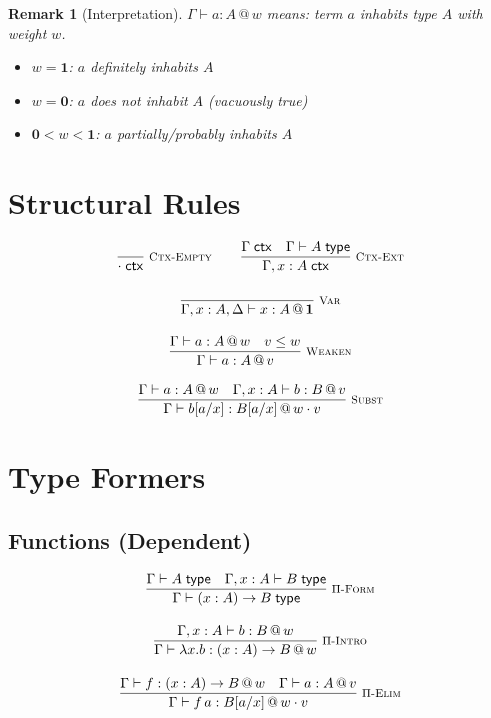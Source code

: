 \documentclass[11pt,a4paper]{article}
\makeatletter
\newcommand{\infer}[3][]{%
  \genfrac{}{}{0.4pt}{0}{#3}{#2}\;\textsc{\footnotesize #1}%
}
\newtheorem{remark}{Remark}[section]
\newcommand{\ctx}{\;\mathsf{ctx}}
\newcommand{\type}{\;\mathsf{type}}
\newcommand{\at}[1]{\,@\,#1}
\newcommand{\one}{\mathbf{1}}
\newcommand{\zero}{\mathbf{0}}
\makeatother
\begin{document}
\begin{remark}[Interpretation]
$\Gamma \vdash a : A \at{w}$ means: term $a$ inhabits type $A$ with weight $w$.
\begin{itemize}
    \item $w = \one$: $a$ definitely inhabits $A$
    \item $w = \zero$: $a$ does not inhabit $A$ (vacuously true)
    \item $\zero < w < \one$: $a$ partially/probably inhabits $A$
\end{itemize}
\end{remark}

\section{Structural Rules}

\begin{gather}
\infer[\textsc{Ctx-Empty}]
  {\cdot \ctx}
  {}
\qquad
\infer[\textsc{Ctx-Ext}]
  {\Gamma, x : A \ctx}
  {\Gamma \ctx \quad \Gamma \vdash A \type}
\\[1em]
\infer[\textsc{Var}]
  {\Gamma, x : A, \Delta \vdash x : A \at{\one}}
  {}
\\[1em]
\infer[\textsc{Weaken}]
  {\Gamma \vdash a : A \at{v}}
  {\Gamma \vdash a : A \at{w} \quad v \leq w}
\\[1em]
\infer[\textsc{Subst}]
  {\Gamma \vdash b[a/x] : B[a/x] \at{w \cdot v}}
  {\Gamma \vdash a : A \at{w} \quad \Gamma, x : A \vdash b : B \at{v}}
\end{gather}

\section{Type Formers}

\subsection{Functions (Dependent)}

\begin{gather}
\infer[\textsc{$\Pi$-Form}]
  {\Gamma \vdash (x : A) \to B \type}
  {\Gamma \vdash A \type \quad \Gamma, x : A \vdash B \type}
\\[1em]
\infer[\textsc{$\Pi$-Intro}]
  {\Gamma \vdash \lambda x. b : (x : A) \to B \at{w}}
  {\Gamma, x : A \vdash b : B \at{w}}
\\[1em]
\infer[\textsc{$\Pi$-Elim}]
  {\Gamma \vdash f\,a : B[a/x] \at{w \cdot v}}
  {\Gamma \vdash f : (x : A) \to B \at{w} \quad \Gamma \vdash a : A \at{v}}
\end{gather}
\end{document}
